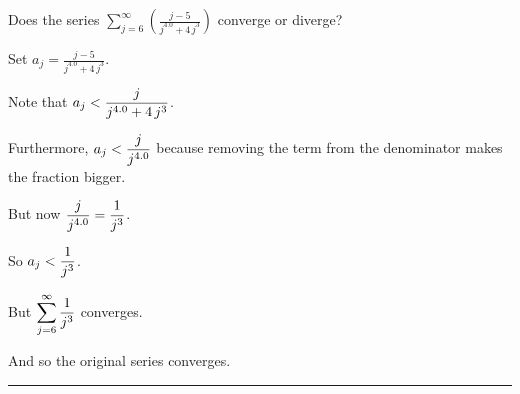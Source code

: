 \documentclass{ximera}
\begin{document}
\begin{question}
  Does the series \(\displaystyle\sum_{j=6}^\infty \left( \displaystyle\frac{j - 5}{j^{4.0} + 4 \, j^{3}} \right)\) converge or diverge?

  \begin{solution}
    \begin{hint}
      Set \(a_j = \displaystyle\frac{j - 5}{j^{4.0} + 4 \, j^{3}}\).
    \end{hint}
    \begin{hint}
      Note that \(a_j < \displaystyle\displaystyle\frac{j}{j^{4.0} + 4 \, j^{3}}\).
    \end{hint}
    \begin{hint}
      Furthermore, \(a_j < \displaystyle\displaystyle\frac{j}{j^{4.0}}\) because removing the term from the denominator makes the fraction bigger.
    \end{hint}
    \begin{hint}
      But now \(\displaystyle\displaystyle\frac{j}{j^{4.0}} = \displaystyle\displaystyle\frac{1}{j^{3}}\).
    \end{hint}
    \begin{hint}
      So \(a_j < \displaystyle\displaystyle\frac{1}{j^{3}}\).
    \end{hint}
    \begin{hint}
      But \(\displaystyle\sum_{j = 6}^\infty \displaystyle\displaystyle\frac{1}{j^{3}}\) converges.
    \end{hint}
    \begin{hint}
      And so the original series converges.
    \end{hint}
    

    \begin{multiple-choice}
      
    \end{multiple-choice}

  \end{solution}
\end{question}

\hrule
\end{document}
